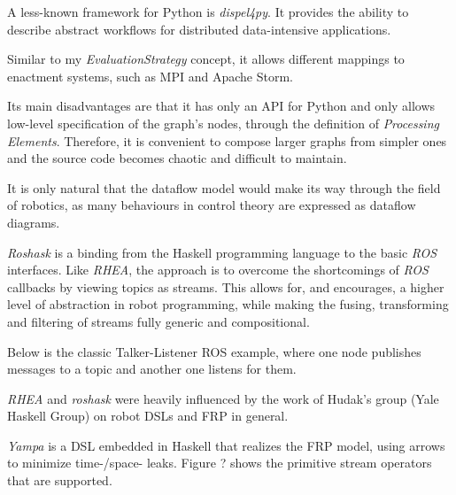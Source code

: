 \documentclass{dithesis}
\begin{document}


A less-known framework for Python is \textit{dispel4py}. It provides the ability to describe abstract workflows for distributed data-intensive applications.

Similar to my \textit{EvaluationStrategy} concept, it allows different mappings to enactment systems, such as MPI and Apache Storm.

Its main disadvantages are that it has only an API for Python and only allows low-level specification of the graph's nodes, through the definition of \textit{Processing Elements}. Therefore, it is convenient to compose larger graphs from simpler ones and the source code becomes chaotic and difficult to maintain.


It is only natural that the dataflow model would make its way through the field of robotics, as many behaviours in control theory are expressed as dataflow diagrams. 


\textit{Roshask}\cite{roshask} is a binding from the Haskell programming language to the basic \textit{ROS} interfaces. Like \textit{RHEA}, the approach is to overcome the shortcomings of \textit{ROS} callbacks by viewing topics as streams. This allows for, and encourages, a higher level of abstraction in robot programming, while making the fusing, transforming and filtering of streams fully generic and compositional. 

Below is the classic Talker-Listener ROS example, where one node publishes messages to a topic and another one listens for them.



\textit{RHEA} and \textit{roshask} were heavily influenced by the work of Hudak's group (Yale Haskell Group) on robot DSLs and FRP in general\cite{fran, arrows_robots,lambda_in_motion,event_frp,real_frp,pushpull_frp}.

\textit{Yampa} is a DSL embedded in Haskell that realizes the FRP model, using arrows to minimize time-/space- leaks. Figure ? shows the primitive stream operators that are supported. 
\end{document}
